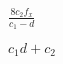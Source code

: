 \documentclass{article}
\begin{document}
$\frac{8c_2f_x}{c_1 - d}$
\pagebreak

$c_1 d + c_2$
\pagebreak
\end{document}
